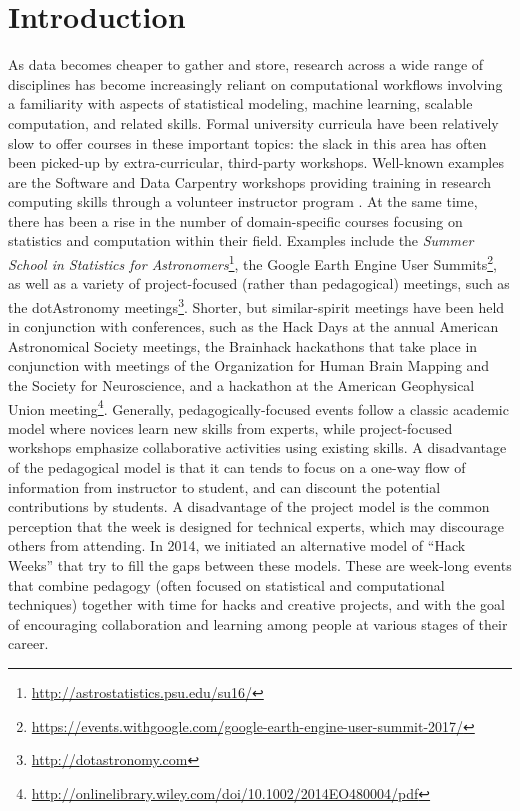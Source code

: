 \section*{Introduction}
\label{sec:introduction}

As data becomes cheaper to gather and store, research across a wide range of disciplines has become increasingly reliant on computational workflows involving a familiarity with aspects of statistical modeling, machine learning, scalable computation, and related skills.
Formal university curricula have been relatively slow to offer courses in these important topics: the slack in this area has often been picked-up by extra-curricular, third-party workshops.
Well-known examples are the Software and Data Carpentry workshops providing training in research computing skills through a volunteer instructor program  \cite{b:wilson-swc-lessons-2016,teal2015data}.
At the same time, there has been a rise in the number of domain-specific courses focusing on statistics and computation within their field.
Examples include the \textit{Summer School in Statistics for Astronomers}\footnote{\url{http://astrostatistics.psu.edu/su16/}}, the Google Earth Engine User Summits\footnote{\url{https://events.withgoogle.com/google-earth-engine-user-summit-2017/}}, as well as a variety of project-focused (rather than pedagogical) meetings, such as the dotAstronomy meetings\footnote{\url{http://dotastronomy.com}}.
Shorter, but similar-spirit meetings have been held in conjunction with conferences, such as the Hack Days at the annual American Astronomical Society meetings, the Brainhack hackathons that take place in conjunction with meetings of the Organization for Human Brain Mapping and the Society for Neuroscience\cite{Cameron_Craddock2016-wc}, and a hackathon at the American Geophysical Union meeting\footnote{\url{http://onlinelibrary.wiley.com/doi/10.1002/2014EO480004/pdf}}.
Generally, pedagogically-focused events follow a classic academic model where novices learn new skills from experts, while project-focused workshops emphasize collaborative activities using existing skills.
A disadvantage of the pedagogical model is that it can tends to focus on a one-way flow of information from instructor to student, and can discount the potential contributions by students.
A disadvantage of the project model is the common perception that the week is designed for technical experts, which may discourage others from attending.
In 2014, we initiated an alternative model of ``Hack Weeks'' that try to fill the gaps between these models.
These are week-long events that combine pedagogy (often focused on statistical and computational techniques) together with time for hacks and creative projects, and with the goal of encouraging collaboration and learning among people at various stages of their career.

